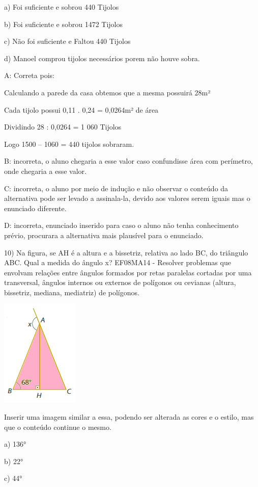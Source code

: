a) Foi suficiente e sobrou 440 Tijolos

b) Foi suficiente e sobrou 1472 Tijolos

c) Não foi suficiente e Faltou 440 Tijolos

d) Manoel comprou tijolos necessários porem não houve sobra.

A: Correta pois:

Calculando a parede da casa obtemos que a mesma possuirá 28m²

Cada tijolo possui 0,11 . 0,24 = 0,0264m² de área

Dividindo 28 : 0,0264 = 1 060 Tijolos

Logo 1500 -- 1060 = 440 tijolos sobraram.

B: incorreta, o aluno chegaria a esse valor caso confundisse área com
perímetro, onde chegaria a esse valor.

C: incorreta, o aluno por meio de indução e não observar o conteúdo da
alternativa pode ser levado a assinala-la, devido aos valores serem
iguais mas o enunciado diferente.

D: incorreta, enunciado inserido para caso o aluno não tenha
conhecimento prévio, procurara a alternativa mais plausível para o
enunciado.

10) Na figura, se AH é a altura e a bissetriz, relativa ao lado BC, do
triângulo ABC. Qual a medida do ângulo x? EF08MA14 - Resolver problemas
que envolvam relações entre ângulos formados por retas paralelas
cortadas por uma transversal, ângulos internos ou externos de polígonos
ou cevianas (altura, bissetriz, mediana, mediatriz) de polígonos.

\includegraphics[width=1.45833in,height=2in]{./imgSAEB_8_MAT/media/image58.png}

Inserir uma imagem similar a essa, podendo ser alterada as cores e o
estilo, mas que o conteúdo continue o mesmo.

a) 136°

b) 22°

c) 44°


